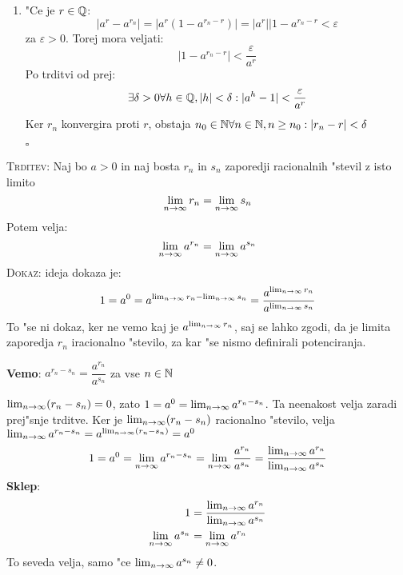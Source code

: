 \begin{enumerate}[(1)]
	\item "Ce je $r \in \mathbb{Q}$:
	\begin{equation*}
	|a^r - a^{r_n}| = |a^r(1 - a^{r_n - r})| = |a^r| |1 - a^{r_n - r} < \varepsilon
	\end{equation*}
	za $\varepsilon > 0$. Torej mora veljati:
	\begin{equation*}
	|1-a^{r_n - r}| < \dfrac{\varepsilon}{a^r}
	\end{equation*}
	Po trditvi od prej:
	\begin{equation*}
	\exists \delta > 0 \forall h \in \mathbb{Q}, |h| < \delta: |a^h - 1| < \dfrac{\varepsilon}{a^r}
	\end{equation*}
	Ker $r_n$ konvergira proti $r$, obstaja $n_0 \in \mathbb{N} \forall n \in \mathbb{N}, n \geq n_0: |r_n - r| < \delta$
	
	\hfill $\square$
\end{enumerate}
\textsc{Trditev:} Naj bo $a > 0$ in naj bosta $r_n$ in $s_n$ zaporedji racionalnih "stevil z isto limito
\begin{equation*}
\lim_{n \rightarrow \infty} r_n = \lim_{n \rightarrow \infty} s_n
\end{equation*}
Potem velja:
\begin{equation*}
\lim_{n \rightarrow \infty} a^{r_n} = \lim_{n \rightarrow \infty} a^{s_n}
\end{equation*}
\textsc{Dokaz:} ideja dokaza je:
\begin{equation*}
1 = a^0 = a^{\lim_{n \rightarrow \infty} r_n - \lim_{n \rightarrow \infty} s_n} = \dfrac{a^{\lim_{n \rightarrow \infty} r_n}}{a^{\lim_{n \rightarrow \infty} s_n}}
\end{equation*}
To "se ni dokaz, ker ne vemo kaj je $a^{\lim_{n \rightarrow \infty} r_n}$, saj se lahko zgodi, da je limita zaporedja $r_n$ iracionalno "stevilo, za kar "se nismo definirali potenciranja.

\textbf{Vemo}: $a^{r_n - s_n} = \dfrac{a^{r_n}}{a^{s_n}}$ za vse $n \in \mathbb{N}$

$\lim_{n \rightarrow \infty} (r_n - s_n) = 0$, zato $1 = a^0 = \lim_{n \rightarrow \infty} a^{r_n - s_n}$. Ta neenakost velja zaradi prej"snje trditve. Ker je $\lim_{n \rightarrow \infty} (r_n - s_n)$ racionalno "stevilo, velja $\lim_{n \rightarrow \infty} a^{r_n - s_n} = a^{\lim_{n \rightarrow \infty} (r_n - s_n)} = a^0$
\begin{equation*}
1 = a^0 = \lim_{n \rightarrow \infty} a^{r_n - s_n} = \lim_{n \rightarrow \infty} \dfrac{a^{r_n}}{a^{s_n}} = \dfrac{\lim_{n \rightarrow \infty} a^{r_n}}{\lim_{n \rightarrow \infty} a^{s_n}}
\end{equation*}
\textbf{Sklep}:
\begin{align*}
1 &= \dfrac{\lim_{n \rightarrow \infty} a^{r_n}}{\lim_{n \rightarrow \infty} a^{s_n}} \\
\lim_{n \rightarrow \infty} a^{s_n} &= \lim_{n \rightarrow \infty} a^{r_n}
\end{align*}
To seveda velja, samo "ce $\lim_{n \rightarrow \infty} a^{s_n} \neq 0$.

